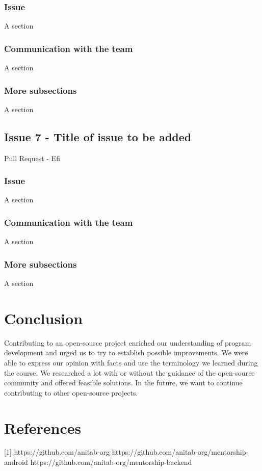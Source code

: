 \documentclass{article}
\begin{document}
\subsubsection{Issue}
A section

\subsubsection{Communication with the team}
A section

\subsubsection{More subsections}
A section
\subsection{Issue 7 - Title of issue to be added}
Pull Request - Efi

\subsubsection{Issue}
A section

\subsubsection{Communication with the team}
A section

\subsubsection{More subsections}
A section

\section{Conclusion}
Contributing to an open-source project
 enriched our understanding  of program 
development and urged us to try to establish 
possible improvements. We were able to express
 our opinion with facts and use the terminology we
 learned during the course. We researched a lot with
 or without the guidance of the open-source community
 and offered feasible solutions. In the future, we want
 to continue contributing to other open-source projects.
\section*{References}
[1] https://github.com/anitab-org
\newline
[2] https://github.com/anitab-org/mentorship-android
\newline
[3] https://github.com/anitab-org/mentorship-backend
\end{document}
